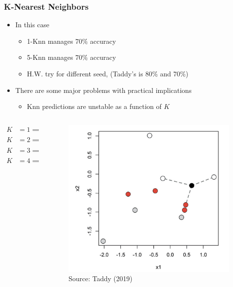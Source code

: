 \documentclass[
  shownotes,
  xcolor={svgnames},
  hyperref={colorlinks,citecolor=DarkBlue,linkcolor=andesred,urlcolor=DarkBlue}
  , aspectratio=169]{beamer}
\begin{document}
\begin{frame}[fragile]
\frametitle{K-Nearest Neighbors}
\begin{itemize}
\item In this case
  \begin{itemize}
    \item 1-Knn manages 70\% accuracy
    \item 5-Knn manages 70\% accuracy
    \item H.W. try for different seed, (Taddy's is 80\% and 70\%)
  \end{itemize}
  \item There are some major problems with practical implications
  \medskip
  \begin{itemize}
  \item Knn predictions are unstable as a function of $K$
    \end{itemize}
\end{itemize}
  \begin{columns}[T] %
\begin{column}{.58\textwidth}
\begin{align}
  K&=1 \implies \hat{p}(white)=0 \nonumber \\
  K&=2 \implies \hat{p}(white)=1/2 \nonumber \\
  K&=3 \implies \hat{p}(white)=2/3 \nonumber \\
  K&=4 \implies \hat{p}(white)=1/2 \nonumber 
  \end{align}


\end{column}
\hfill
\begin{column}{.4\textwidth}
\begin{figure}[H] \centering
            \captionsetup{justification=centering}
              \includegraphics[scale=0.1]{figures/knn}
              \\
              \tiny
              Source: Taddy (2019)
 \end{figure}
\end{column}
\end{columns}
  

\end{frame}
\end{document}
